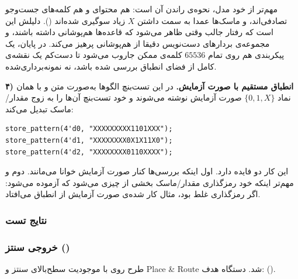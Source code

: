\documentclass[10pt,a4paper]{article}
\begin{document}
مهم‌تر از خود مدل، {نحوه‌ی راندن} آن است: هم محتوای  و هم کلمه‌های جست‌وجو تصادفی‌اند، و ماسک‌ها عمدا به سمت داشتن $X$ زیاد سوگیری شده‌اند (). دلیلش این است که رفتار جالب  وقتی ظاهر می‌شود که قاعده‌ها {هم‌پوشانی} داشته باشند، و مجموعه‌ی بردارهای دست‌نویس دقیقا از هم‌پوشانی پرهیز می‌کند. در پایان، یک پیکربندی هم روی تمام $65536$ کلمه‌ی ممکن جاروب می‌شود تا دست‌کم یک نقشه‌ی کامل از فضای انطباق بررسی شده باشد، نه نمونه‌برداری‌شده.

\begin{latin}

\end{latin}

\textbf{۴) انطباق مستقیم با صورت آزمایش.} در این تست‌بنچ الگوها به‌صورت {متن} و با همان نماد $\{0,1,X\}$ صورت آزمایش نوشته می‌شوند و خود تست‌بنچ آن‌ها را به زوج مقدار/ماسک تبدیل می‌کند:

\begin{latin}
\begin{lstlisting}[style=verilog,numbers=none]
store_pattern(4'd0, "XXXXXXXXX1101XXX");
store_pattern(4'd1, "XXXXXXXX0X1X11X0");
store_pattern(4'd2, "XXXXXXXX0110XXXX");
\end{lstlisting}
\end{latin}

این کار دو فایده دارد. اول اینکه بررسی‌ها کنار صورت آزمایش خوانا می‌مانند. دوم و مهم‌تر اینکه {خود رمزگذاری مقدار/ماسک} بخشی از چیزی می‌شود که آزموده می‌شود: اگر رمزگذاری غلط بود، مثال کار شده‌ی صورت آزمایش از انطباق می‌افتاد.

\begin{latin}

\end{latin}

\subsubsection*{نتایج تست}

\begin{latin}

\end{latin}


\pagebreak
\subsubsection*{خروجی سنتز ()}

طرح روی  با موجودیت سطح‌بالای  سنتز و Place \& Route شد. دستگاه هدف:  ().
\end{document}
